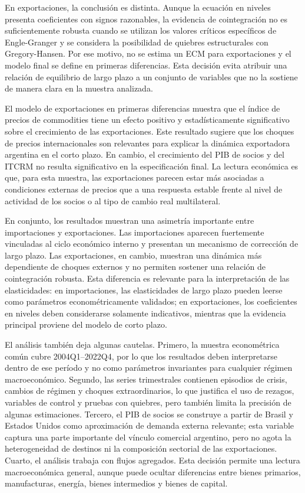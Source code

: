 \documentclass[11pt]{article}
\begin{document}
En exportaciones, la conclusión es distinta. Aunque la ecuación en niveles
presenta coeficientes con signos razonables, la evidencia de cointegración no
es suficientemente robusta cuando se utilizan los valores críticos específicos
de Engle-Granger y se considera la posibilidad de quiebres estructurales con
Gregory-Hansen. Por ese motivo, no se estima un ECM para exportaciones y el
modelo final se define en primeras diferencias. Esta decisión evita atribuir
una relación de equilibrio de largo plazo a un conjunto de variables que no la
sostiene de manera clara en la muestra analizada.

El modelo de exportaciones en primeras diferencias muestra que el índice de
precios de commodities tiene un efecto positivo y estadísticamente significativo sobre el
crecimiento de las exportaciones. Este resultado sugiere que los choques de
precios internacionales son relevantes para explicar la dinámica exportadora
argentina en el corto plazo. En cambio, el crecimiento del PIB de socios y del
ITCRM no resulta significativo en la especificación final. La lectura económica
es que, para esta muestra, las exportaciones parecen estar más asociadas a
condiciones externas de precios que a una respuesta estable frente al nivel de
actividad de los socios o al tipo de cambio real multilateral.

En conjunto, los resultados muestran una asimetría importante entre
importaciones y exportaciones. Las importaciones aparecen fuertemente
vinculadas al ciclo económico interno y presentan un mecanismo de corrección de
largo plazo. Las exportaciones, en cambio, muestran una dinámica más dependiente
de choques externos y no permiten sostener una relación de cointegración robusta.
Esta diferencia es relevante para la interpretación de las elasticidades: en
importaciones, las elasticidades de largo plazo pueden leerse como parámetros
econométricamente validados; en exportaciones, los coeficientes en niveles
deben considerarse solamente indicativos, mientras que la evidencia principal
proviene del modelo de corto plazo.

El análisis también deja algunas cautelas. Primero, la muestra econométrica
común cubre 2004Q1--2022Q4, por lo que los resultados deben interpretarse
dentro de ese período y no como parámetros invariantes para cualquier régimen
macroeconómico. Segundo, las series trimestrales contienen episodios de crisis,
cambios de régimen y choques extraordinarios, lo que justifica el uso de rezagos,
variables de control y pruebas con quiebres, pero también limita la precisión de
algunas estimaciones. Tercero, el PIB de socios se construye a partir de Brasil
y Estados Unidos como aproximación de demanda externa relevante; esta variable
captura una parte importante del vínculo comercial argentino, pero no agota la
heterogeneidad de destinos ni la composición sectorial de las exportaciones.
Cuarto, el análisis trabaja con flujos agregados. Esta decisión permite una
lectura macroeconómica general, aunque puede ocultar diferencias entre bienes
primarios, manufacturas, energía, bienes intermedios y bienes de capital.
\end{document}
